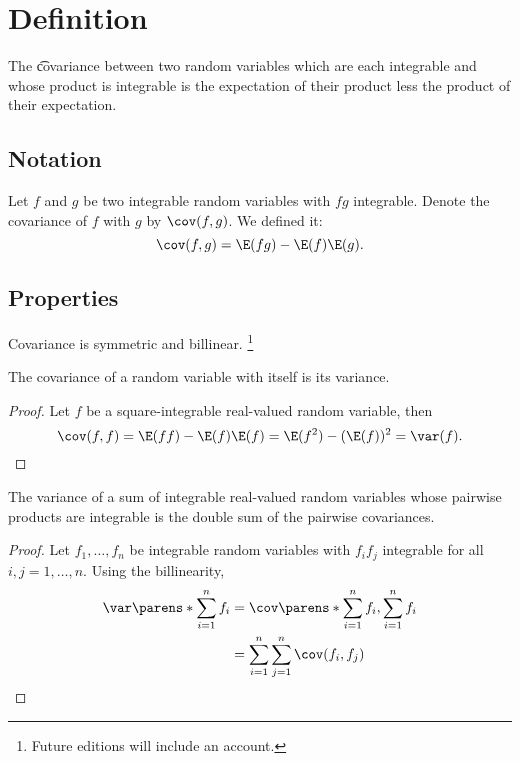 
\section*{Definition}

The \t{covariance} between two random variables which are each integrable and whose product is integrable is the expectation of their product less the product of their expectation.

\subsection*{Notation}

Let $f$ and $g$ be two integrable random variables with $fg$ integrable.
Denote the covariance of $f$ with $g$ by $\cov(f, g)$.
We defined it:
  \[
\cov(f, g) = \E (fg) - \E (f)\E (g).
  \]

\subsection*{Properties}

\begin{prop}
Covariance is symmetric and billinear.
  \ifhmode\unskip\fi\footnote{
Future editions will include an account.
  }
\end{prop}

\begin{prop}
The covariance of a random variable with itself is its variance.
\begin{proof}
Let $f$ be a square-integrable real-valued random variable, then
  \[
\cov(f, f) = \E (ff) - \E (f)\E (f) = \E (f^2) - (\E (f))^2 = \var(f).
  \]
\end{proof}
\end{prop}

\begin{prop}
The variance of a
sum of integrable
real-valued random variables
whose pairwise products
are integrable
is the double sum of
the pairwise covariances.
\begin{proof}
Let $f_1, \dots , f_n$ be integrable random variables with $f_if_j$ integrable for all $i,j = 1, \dots , n$.
Using the billinearity,
  \[
\begin{aligned}
\var\parens*{\sum_{i = 1}^{n} f_i}
&= \cov\parens*{\sum_{i = 1}^{n} f_i, \sum_{i = 1}^{n}f_i} \\
&= \sum_{i = 1}^{n} \sum_{j = 1}^{n} \cov(f_i, f_j)
\end{aligned}
  \]
\end{proof}
\end{prop}
